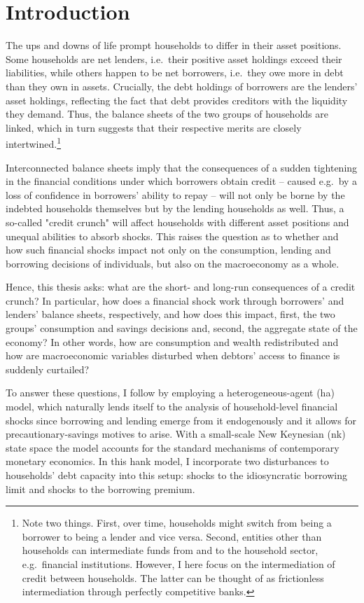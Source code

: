 \documentclass[a4paper,12pt]{article} %
\numberwithin{equation}{section} %
\numberwithin{figure}{section}
\numberwithin{table}{section}
\begin{document}
\section{Introduction}
\label{sec:introduction}

The ups and downs of life prompt households to differ in their asset positions. Some households are net lenders, i.e.~their positive asset holdings exceed their liabilities, while others happen to be net borrowers, i.e.~they owe more in debt than they own in assets. Crucially, the debt holdings of borrowers are the lenders' asset holdings, reflecting the fact that debt provides creditors with the liquidity they demand. Thus, the balance sheets of the two groups of households are linked, which in turn suggests that their respective merits are closely intertwined.\footnote{Note two things. First, over time, households might switch from being a borrower to being a lender and vice versa. Second, entities other than households can intermediate funds from and to the household sector, e.g.~financial institutions. However, I here focus on the intermediation of credit between households. The latter can be thought of as frictionless intermediation through perfectly competitive banks.}

Interconnected balance sheets imply that the consequences of a sudden tightening in the financial conditions under which borrowers obtain credit -- caused e.g.~by a loss of confidence in borrowers' ability to repay -- will not only be borne by the indebted households themselves but by the lending households as well. Thus, a so-called "credit crunch" will affect households with different asset positions and unequal abilities to absorb shocks. This raises the question as to whether and how such financial shocks impact not only on the consumption, lending and borrowing decisions of individuals, but also on the macroeconomy as a whole. 

Hence, this thesis asks: what are the short- and long-run consequences of a credit crunch? In particular, how does a financial shock work through borrowers' and lenders' balance sheets, respectively, and how does this impact, first, the two groups' consumption and savings decisions and, second, the aggregate state of the economy? In other words, how are consumption and wealth redistributed and how are macroeconomic variables disturbed when debtors' access to finance is suddenly curtailed?

To answer these questions, I follow \textcite{gl2017} by employing a heterogeneous-agent (\Gls{ha}) model, which naturally lends itself to the analysis of household-level financial shocks since borrowing and lending emerge from it endogenously and it allows for precautionary-savings motives to arise. With a small-scale New Keynesian (\Gls{nk}) state space the model accounts for the standard mechanisms of contemporary monetary economics. In this \Gls{hank} model, I incorporate two disturbances to households' debt capacity into this setup: shocks to the idiosyncratic borrowing limit and shocks to the borrowing premium. 
\end{document}
